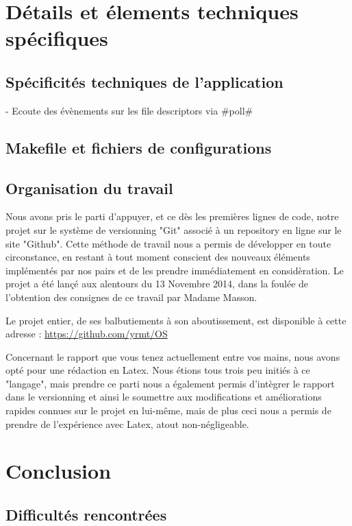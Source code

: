 \documentclass{report}
\begin{document}
{\chapter{Détails et élements techniques spécifiques}

	\section{Spécificités techniques de l'application}

		- Ecoute des évènements sur les file descriptors via #poll#

	\section{Makefile et fichiers de configurations}

	\section{Organisation du travail}

		Nous avons pris le parti d'appuyer, et ce dès les premières lignes de code, notre projet sur le système de versionning "Git" associé
		à un repository en ligne sur le site "Github".
		Cette méthode de travail nous a permis de développer en toute circonstance, en restant à tout moment conscient des nouveaux éléments 
		implémentés par nos pairs et de les prendre immédiatement en considèration.
		Le projet a été lançé aux alentours du 13 Novembre 2014, dans la foulée de l'obtention des consignes de ce travail par Madame Masson.

		Le projet entier, de ses balbutiements à son aboutissement, est disponible à cette adresse : \url{https://github.com/yrmt/OS}

		Concernant le rapport que vous tenez actuellement entre vos mains, nous avons opté pour une rédaction en Latex.
		Nous étions tous trois peu initiés à ce "langage", mais prendre ce parti nous a également permis d'intègrer le rapport
		dans le versionning et ainsi le soumettre aux modifications et améliorations rapides connues sur le projet en lui-même, mais de plus
		ceci nous a permis de prendre de l'expérience avec Latex, atout non-négligeable.

\chapter{Conclusion}
	
	\section{Difficultés rencontrées}

}
\end{document}
